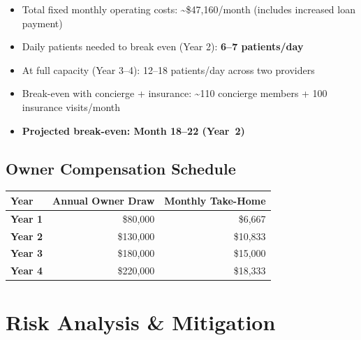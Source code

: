 \documentclass[11pt,letterpaper]{article}
\newcommand{\thead}[1]{\cellcolor{navy}\color{white}\bfseries\small #1}
\newcommand{\trow}{\rowcolor{rowshade}}
\begin{document}
\begin{itemize}
  \item Total fixed monthly operating costs: \textasciitilde\$47,160/month (includes increased loan payment)
  \item Daily patients needed to break even (Year 2): \textbf{6--7 patients/day}
  \item At full capacity (Year 3--4): 12--18 patients/day across two providers
  \item Break-even with concierge + insurance: \textasciitilde110 concierge members + 100 insurance visits/month
  \item \textbf{Projected break-even: Month 18--22 (Year~2)}
\end{itemize}

\subsection{Owner Compensation Schedule}

\vspace{6pt}
\begin{tabularx}{\linewidth}{|>{\bfseries}l|r|r|}
\hline
\thead{Year} & \thead{Annual Owner Draw} & \thead{Monthly Take-Home} \\
\hline
\trow Year 1 & \$80,000 & \$6,667 \\
Year 2 & \$130,000 & \$10,833 \\
\trow Year 3 & \$180,000 & \$15,000 \\
Year 4 & \$220,000 & \$18,333 \\
\hline
\end{tabularx}

\newpage

\section{Risk Analysis \& Mitigation}
\end{document}
